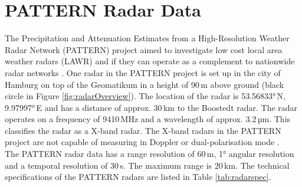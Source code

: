 \documentclass[11pt,twoside,a4paper,fleqn,x11names]{report}
\numberwithin{equation}{chapter}
\numberwithin{figure}{chapter}
\numberwithin{table}{chapter}
\begin{document}
\section{PATTERN Radar Data}
The Precipitation and Attenuation Estimates from a High-Resolution Weather Radar Network (PATTERN) project aimed to investigate low cost local area weather radars (LAWR) and if they can operate as a complement to nationwide radar networks \citep{Lengfeld2014}. One radar in the PATTERN project is set up in the city of Hamburg on top of the Geomatikum in a height of 90\,m above ground (black circle in Figure \ref{fig:radarOverview}). The location of the radar is 53.56833°\,N, 9.97997°\,E and has a distance of approx. 30\,km to the Boostedt radar. The radar operates on a frequency of 9410\,MHz and a wavelength of approx. 3.2\,µm. This classifies the radar as a X-band radar. The X-band radars in the PATTERN project are not capable of measuring in Doppler or dual-polarisation mode \citep{Lengfeld2014}.\\
The PATTERN radar data has a range resolution of 60\,m, 1° angular resolution and a temporal resolution of 30\,s. The maximum range is 20\,km. The technical specifications of the PATTERN radars are listed in Table \ref{tab:radarspec}.
\end{document}
